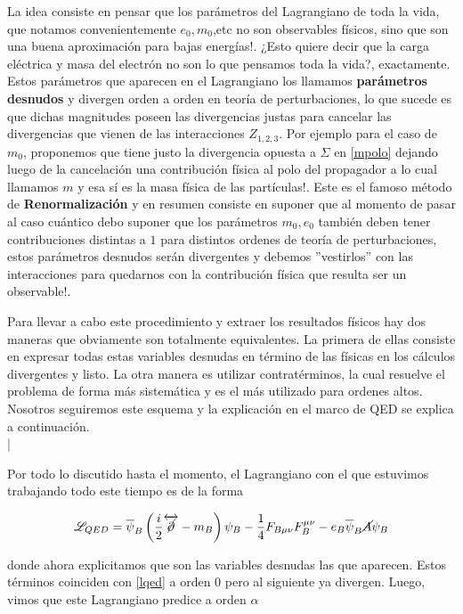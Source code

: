\documentclass[tickz]{article}
\numberwithin{equation}{section}
\begin{document}
La idea consiste en pensar que los parámetros del Lagrangiano de toda la vida, que notamos convenientemente $ e_0, m_0$,etc no son observables físicos, sino que son una buena aproximación para bajas energías!. ¿Esto quiere decir que la carga eléctrica y masa del electrón no son lo que pensamos toda la vida?, exactamente. Estos parámetros que aparecen en el Lagrangiano los llamamos \textbf{parámetros desnudos} y divergen orden a orden en teoría de perturbaciones, lo que sucede es que dichas magnitudes poseen las divergencias justas para cancelar las divergencias que vienen de las interacciones $ Z_{1,2,3} $. Por ejemplo para el caso de $ m_0 $, proponemos que tiene justo la divergencia opuesta a $ \Sigma $ en \ref{mpolo} dejando luego de la cancelación una contribución física al polo del propagador a lo cual llamamos $ m $ y esa sí es la masa física de las partículas!. Este es el famoso método de \textbf{Renormalización} y en resumen consiste en suponer que al momento de pasar al caso cuántico debo suponer que los parámetros $ m_0,e_0 $ también deben tener contribuciones distintas a $ 1 $ para distintos ordenes de teoría de perturbaciones, estos parámetros desnudos serán divergentes y debemos ''vestirlos'' con las interacciones para quedarnos con la contribución física que resulta ser un observable!.

Para llevar a cabo este procedimiento y extraer los resultados físicos hay dos maneras que obviamente son totalmente equivalentes. La primera de ellas consiste en expresar todas estas variables desnudas en término de las físicas en los cálculos divergentes y listo. La otra manera es utilizar contratérminos, la cual resuelve el problema de forma más sistemática y es el más utilizado para ordenes altos. Nosotros seguiremos este esquema y la explicación en el marco de QED se explica a continuación.\\|

Por todo lo discutido hasta el momento, el Lagrangiano con el que estuvimos trabajando todo este tiempo es de la forma

\begin{equation}\label{lqedb}
\mathscr{L}_{QED}=\overline{\psi}_B\left(\frac{i}{2}
\overleftrightarrow{\cancel{\partial}}-m_B\right)\psi_B-\frac{1}{4}F_{B \mu\nu}F_B^{\mu\nu}-e_B\overline{\psi}_B\cancel{A}\psi_B
\end{equation}

donde ahora explicitamos que son las variables desnudas las que aparecen. Estos términos coinciden con \ref{lqed} a orden 0 pero al siguiente ya divergen. Luego, vimos que este Lagrangiano predice a orden $ \alpha $
\end{document}

